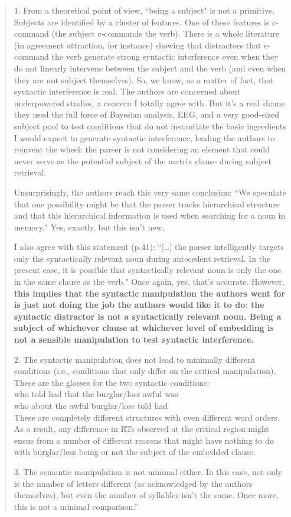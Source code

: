 \documentclass[12pt]{article}
\begin{document}
\begin{quote}
1. From a theoretical point of view, ``being a subject" is not a primitive. Subjects are identified by a cluster of features. One of these features is c-command (the subject c-commands the verb). There is a whole literature (in agreement attraction, for instance) showing that distractors that c-command the verb generate strong syntactic interference even when they do not linearly intervene between the subject and the verb (and even when they are not subject themselves). So, we know, as a matter of fact, that syntactic interference is real.
The authors are concerned about underpowered studies, a concern I totally agree with. But it's a real shame they used the full force of Bayesian analysis, EEG, and a very good-sized subject pool to test conditions that do not instantiate the basic ingredients I would expect to generate syntactic interference, leading the authors to reinvent the wheel: the parser is not considering an element that could never serve as the potential subject of the matrix clause during subject retrieval.

Unsurprisingly, the authors reach this very same conclusion: ``We speculate that one possibility might be that the parser tracks hierarchical structure and that this hierarchical information is used when searching for a noun in memory." Yes, exactly, but this isn't new.

I also agree with this statement (p.41): ``[…] the parser intelligently targets only the syntactically relevant noun during antecedent retrieval. In the present case, it is possible that syntactically relevant noun is only the one in the same clause as the verb." Once again, yes, that's accurate. However, \textbf{this implies that the syntactic manipulation the authors went for is just not doing the job the authors would like it to do: the syntactic distractor is not a syntactically relevant noun. Being a subject of whichever clause at whichever level of embedding is not a sensible manipulation to test syntactic interference.}

2. The syntactic manipulation does not lead to minimally different conditions (i.e., conditions that only differ on the critical manipulation). These are the glosses for the two syntactic conditions:\\

who told had that the burglar/loss awful was\\
who about the awful burglar/loss told had\\

These are completely different structures with even different word orders. As a result, any difference in RTs observed at the critical region might ensue from a number of different reasons that might have nothing to do with burglar/loss being or not the subject of the embedded clause.

3. The semantic manipulation is not minimal either. In this case, not only is the number of letters different (as acknowledged by the authors themselves), but even the number of syllables isn't the same. Once more, this is not a minimal comparison.''
\end{quote}
\end{document}
